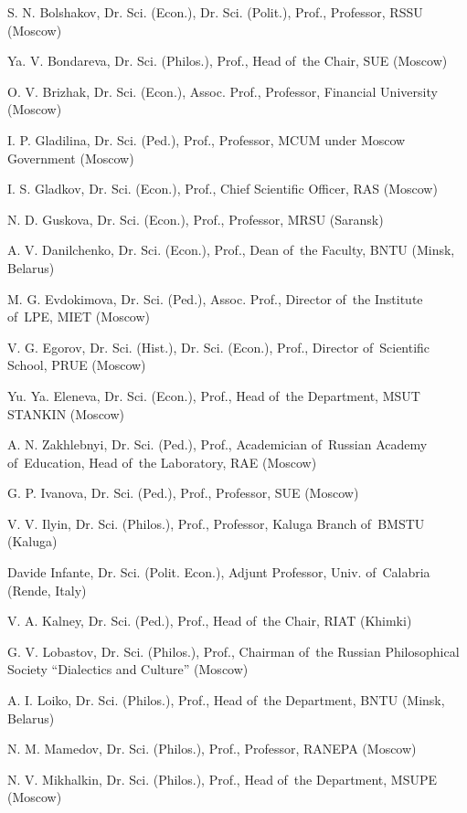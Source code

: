 \begin{otherlanguage}{english}
\begin{multicols}{2}
\begin{flushleft}
\noindent S. N. Bolshakov, Dr. Sci. (Econ.), Dr. Sci. (Polit.), Prof., Professor, RSSU (Moscow)

\noindent Ya. V. Bondareva, Dr. Sci. (Philos.), Prof., Head of the Chair, SUE (Moscow)

\noindent O. V. Brizhak, Dr. Sci. (Econ.), Assoc. Prof., Professor, Financial University (Moscow)

\noindent I. P. Gladilina, Dr. Sci. (Ped.), Prof., Professor, MCUM under Moscow Government (Moscow)

\noindent I. S. Gladkov, Dr. Sci. (Econ.), Prof., Chief Scientific Officer, RAS (Moscow)

\noindent N. D. Guskova, Dr. Sci. (Econ.), Prof., Professor, MRSU (Saransk)

\noindent A. V. Danilchenko, Dr. Sci. (Econ.), Prof., Dean of the Faculty, BNTU (Minsk, Belarus)

\noindent M. G. Evdokimova, Dr. Sci. (Ped.), Assoc. Prof., Director of the Institute of LPE, MIET (Moscow)

\noindent V. G. Egorov, Dr. Sci. (Hist.), Dr. Sci. (Econ.), Prof., Director of Scientific School, PRUE (Moscow)

\noindent Yu. Ya. Eleneva, Dr. Sci. (Econ.), Prof., Head of the Department, MSUT STANKIN (Moscow)

\noindent A. N. Zakhlebnyi, Dr. Sci. (Ped.), Prof., Academician of Russian Academy of Education, Head of the Laboratory, RAE (Moscow)

\noindent G. P. Ivanova, Dr. Sci. (Ped.), Prof., Professor, SUE (Moscow)

\noindent V. V. Ilyin, Dr. Sci. (Philos.), Prof., Professor, Kaluga Branch of BMSTU (Kaluga)

\noindent Davide Infante, Dr. Sci. (Polit. Econ.), Adjunt Professor, Univ. of Calabria (Rende, Italy)

\noindent V. A. Kalney, Dr. Sci. (Ped.), Prof., Head of the Chair, RIAT (Khimki)

\noindent G. V. Lobastov, Dr. Sci. (Philos.), Prof., Chairman of the Russian Philosophical Society “Dialectics and Culture” (Moscow)

\noindent A. I. Loiko, Dr. Sci. (Philos.), Prof., Head of the Department, BNTU (Minsk, Belarus)

\noindent N. M. Mamedov, Dr. Sci. (Philos.), Prof., Professor, RANEPA (Moscow)

\noindent N. V. Mikhalkin, Dr. Sci. (Philos.), Prof., Head of the Department, MSUPE (Moscow)


\end{flushleft}
\end{multicols}
\end{otherlanguage}
